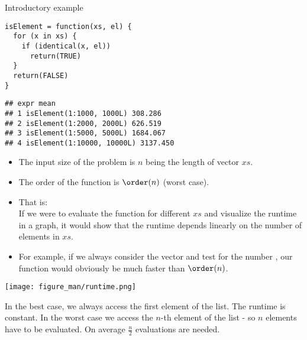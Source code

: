 \documentclass[11pt,compress,t,notes=noshow, xcolor=table]{beamer}
\begin{document}
\begin{vbframe}{Introductory example}
\lz
\footnotesize
\begin{verbatim}
isElement = function(xs, el) {
  for (x in xs) {
    if (identical(x, el))
      return(TRUE)
  }
  return(FALSE)
}
\end{verbatim}

\lz
\begin{verbatim}
## expr mean
## 1 isElement(1:1000, 1000L) 308.286
## 2 isElement(1:2000, 2000L) 626.519
## 3 isElement(1:5000, 5000L) 1684.067
## 4 isElement(1:10000, 10000L) 3137.450
\end{verbatim}

%

\normalsize
\framebreak

\begin{itemize}
  \item The input size of the problem is $n$ being the length of vector $xs$.
  \item The order of the function is $\order(n)$ (worst case).
  \item That is: \\
  If we were to evaluate the function for different $xs$ and visualize the runtime in
  a graph, it would show that the runtime depends linearly on the number of elements in $xs$.
   \item For example, if we always consider the vector  and test for the number , our function would obviously be much faster than $\order(n)$.
\end{itemize}


\framebreak

\begin{center}
\texttt{[image: figure\_man/runtime.png]}
\end{center}

\begin{footnotesize}
In the best case, we always access the first element of the list. The runtime is constant. In the worst case we access the $n$-th element of the list - so $n$ elements have to be evaluated. On average $\frac{n}{2}$ evaluations are needed.
\end{footnotesize}



\end{vbframe}
\end{document}
